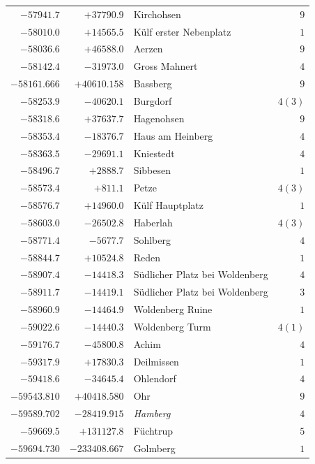 \begin{center}
\begin{tabular}{r|r|p{170pt}|r}
\(-57941.7\)&\(+37790.9\)&Kirchohsen&\(9\)\\
\(-58010.0\)&\(+14565.5\)&Külf erster Nebenplatz&\(1\)\\
\(-58036.6\)&\(+46588.0\)&Aerzen&\(9\)\\
\(-58142.4\)&\(-31973.0\)&Gross Mahnert&\(4\)\\
\(-58161.666\)&\(+40610.158\)&Bassberg&\(9\)\\
\(-58253.9\)&\(-40620.1\)&Burgdorf&\(4 (3)\)\\
\(-58318.6\)&\(+37637.7\)&Hagenohsen&\(9\)\\
\(-58353.4\)&\(-18376.7\)&Haus am Heinberg&\(4\)\\
\(-58363.5\)&\(-29691.1\)&Kniestedt&\(4\)\\
\(-58496.7\)&\(+2888.7\)&Sibbesen&\(1\)\\
\(-58573.4\)&\(+811.1\)&Petze&\(4 (3)\)\\
\(-58576.7\)&\(+14960.0\)&Külf Hauptplatz&\(1\)\\
\(-58603.0\)&\(-26502.8\)&Haberlah&\(4 (3)\)\\
\(-58771.4\)&\(-5677.7\)&Sohlberg&\(4\)\\
\(-58844.7\)&\(+10524.8\)&Reden&\(1\)\\
\(-58907.4\)&\(-14418.3\)&Südlicher Platz bei Woldenberg\hfill\smash{\raisebox{-4.5pt}{\(\Bigg\}\)}}&\(4\)\\
\(-58911.7\)&\(-14419.1\)&Südlicher Platz bei Woldenberg&\(3\)\\
\(-58960.9\)&\(-14464.9\)&Woldenberg Ruine&\(1\)\\
\(-59022.6\)&\(-14440.3\)&Woldenberg Turm&\(4 (1)\)\\
\(-59176.7\)&\(-45800.8\)&Achim&\(4\)\\
\(-59317.9\)&\(+17830.3\)&Deilmissen&\(1\)\\
\(-59418.6\)&\(-34645.4\)&Ohlendorf&\(4\)\\
\(-59543.810\)&\(+40418.580\)&Ohr&\(9\)\\
\(-59589.702\)&\(-28419.915\)&\textit{Hamberg}&\(4\)\\
\(-59669.5\)&\(+131127.8\)&Füchtrup&\(5\)\\
\(-59694.730\)&\(-233408.667\)&Golmberg&\(1\)\\
\hline\end{tabular}\endgroup\end{center}
\clearpage
